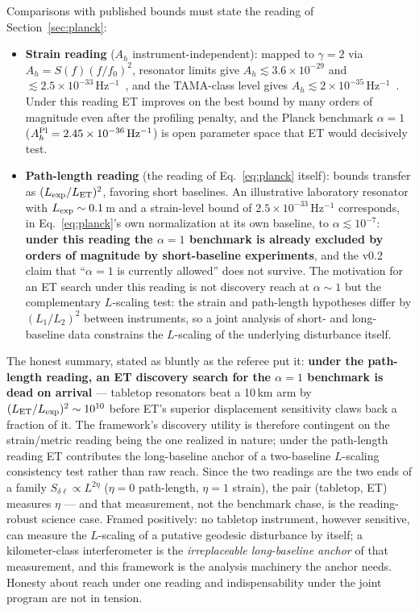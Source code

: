 \documentclass[11pt]{article}
\newcommand{\Ah}{A_h}
\begin{document}
Comparisons with published bounds must state the reading of Section~\ref{sec:planck}:
\begin{itemize}
\item \textbf{Strain reading} ($\Ah$ instrument-independent): mapped to $\gamma=2$ via $\Ah = S(f) (f/f_0)^2$, resonator limits give $\Ah \lesssim 3.6\times10^{-29}$ and $\lesssim 2.5\times10^{-33}\,\mathrm{Hz^{-1}}$~\cite{schiller}, and the TAMA-class level gives $\Ah \lesssim 2\times10^{-35}\,\mathrm{Hz^{-1}}$~\cite{schiller}. Under this reading ET improves on the best bound by many orders of magnitude even after the profiling penalty, and the Planck benchmark $\alpha = 1$ ($\Ah^{\rm Pl} = 2.45\times10^{-36}\,\mathrm{Hz^{-1}}$) is open parameter space that ET would decisively test.
\item \textbf{Path-length reading} (the reading of Eq.~\eqref{eq:planck} itself): bounds transfer as $(L_{\rm exp}/L_{\rm ET})^2$, favoring short baselines. An illustrative laboratory resonator with $L_{\rm exp} \sim 0.1$\,m and a strain-level bound of $2.5\times10^{-33}\,\mathrm{Hz^{-1}}$ corresponds, in Eq.~\eqref{eq:planck}'s own normalization at its own baseline, to $\alpha \lesssim 10^{-7}$: \textbf{under this reading the $\alpha = 1$ benchmark is already excluded by orders of magnitude by short-baseline experiments}, and the v0.2 claim that ``$\alpha = 1$ is currently allowed'' does not survive. The motivation for an ET search under this reading is not discovery reach at $\alpha \sim 1$ but the complementary $L$-scaling test: the strain and path-length hypotheses differ by $(L_1/L_2)^2$ between instruments, so a joint analysis of short- and long-baseline data constrains the $L$-scaling of the underlying disturbance itself.
\end{itemize}
The honest summary, stated as bluntly as the referee put it: \textbf{under the path-length reading, an ET discovery search for the $\alpha = 1$ benchmark is dead on arrival} --- tabletop resonators beat a 10\,km arm by $(L_{\rm ET}/L_{\rm exp})^2 \sim 10^{10}$ before ET's superior displacement sensitivity claws back a fraction of it. The framework's discovery utility is therefore contingent on the strain/metric reading being the one realized in nature; under the path-length reading ET contributes the long-baseline anchor of a two-baseline $L$-scaling consistency test rather than raw reach. Since the two readings are the two ends of a family $S_{\delta\ell} \propto L^{2\eta}$ ($\eta = 0$ path-length, $\eta = 1$ strain), the pair (tabletop, ET) measures $\eta$ --- and that measurement, not the benchmark chase, is the reading-robust science case. Framed positively: no tabletop instrument, however sensitive, can measure the $L$-scaling of a putative geodesic disturbance by itself; a kilometer-class interferometer is the \emph{irreplaceable long-baseline anchor} of that measurement, and this framework is the analysis machinery the anchor needs. Honesty about reach under one reading and indispensability under the joint program are not in tension.
\end{document}
